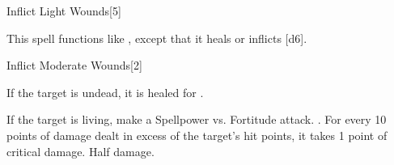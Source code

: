 \begin{spellsection}[Mass]{Inflict Light Wounds}[5]
    \begin{spellheader}
    \end{spellheader}
    \begin{spellcontent}
        \begin{spelltargetinginfo}
        \end{spelltargetinginfo}
        \begin{spelleffects}
            \spellspecial This spell functions like , except that it heals or inflicts [d6].
        \end{spelleffects}
    \end{spellcontent}
    \begin{spellfooter}
        \miscastexplode
    \end{spellfooter}
\end{spellsection}

\begin{spellsection}{Inflict Moderate Wounds}[2]
    \begin{spellheader}
    \end{spellheader}
    \begin{spellcontent}
        \begin{spelltargetinginfo}
        \end{spelltargetinginfo}
        \begin{spelleffects}
            \spelleffect If the target is undead, it is healed for .
            \begin{spellattacktriggered}{If the target is living, make a Spellpower vs. Fortitude attack.}
                \spellsuccess {}. For every 10 points of damage dealt in excess of the target's hit points, it takes 1 point of critical damage.
                \spellfailure Half damage.
            \end{spellattacktriggered}
        \end{spelleffects}
    \end{spellcontent}
    \begin{spellfooter}
        \miscastrandom
    \end{spellfooter}
\end{spellsection}

